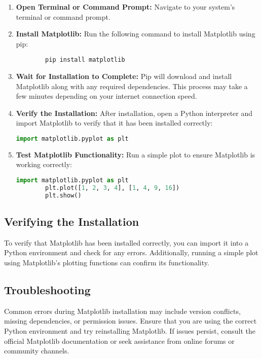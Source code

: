 \begin{enumerate}[label=\arabic*.]
	\item \textbf{Open Terminal or Command Prompt:} Navigate to your system's terminal or command prompt.
	
	\item \textbf{Install Matplotlib:} Run the following command to install Matplotlib using pip:
	\begin{lstlisting}
		pip install matplotlib
	\end{lstlisting}
	
	\item \textbf{Wait for Installation to Complete:} Pip will download and install Matplotlib along with any required dependencies. This process may take a few minutes depending on your internet connection speed.
	
	\item \textbf{Verify the Installation:} After installation, open a Python interpreter and import Matplotlib to verify that it has been installed correctly:
	\begin{lstlisting}[language=Python]
		import matplotlib.pyplot as plt
	\end{lstlisting}
	
	\item \textbf{Test Matplotlib Functionality:} Run a simple plot to ensure Matplotlib is working correctly:
	\begin{lstlisting}[language=Python]
		import matplotlib.pyplot as plt
		plt.plot([1, 2, 3, 4], [1, 4, 9, 16])
		plt.show()
	\end{lstlisting}
\end{enumerate}

\subsection{Verifying the Installation}
To verify that Matplotlib has been installed correctly, you can import it into a Python environment and check for any errors. Additionally, running a simple plot using Matplotlib's plotting functions can confirm its functionality.

\subsection{Troubleshooting}
Common errors during Matplotlib installation may include version conflicts, missing dependencies, or permission issues. Ensure that you are using the correct Python environment and try reinstalling Matplotlib. If issues persist, consult the official Matplotlib documentation or seek assistance from online forums or community channels.

